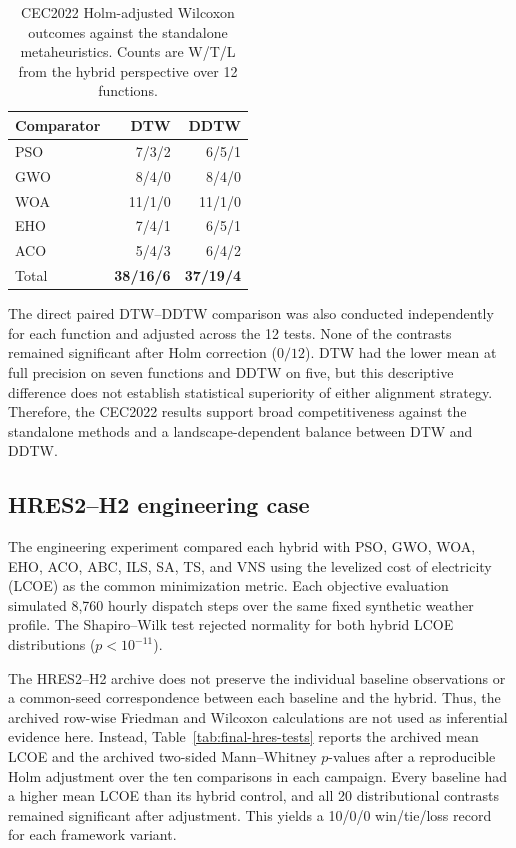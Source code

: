 \begin{table}[htbp]
\centering
\caption{CEC2022 Holm-adjusted Wilcoxon outcomes against the standalone
metaheuristics. Counts are W/T/L from the hybrid perspective over 12
functions.}
\label{tab:final-cec-wtl}
\begin{tabular}{lrr}
\toprule
Comparator & DTW & DDTW \\
\midrule
PSO & 7/3/2  & 6/5/1 \\
GWO & 8/4/0  & 8/4/0 \\
WOA & 11/1/0 & 11/1/0 \\
EHO & 7/4/1  & 6/5/1 \\
ACO & 5/4/3  & 6/4/2 \\
\midrule
Total & \textbf{38/16/6} & \textbf{37/19/4} \\
\bottomrule
\end{tabular}
\end{table}

The direct paired DTW--DDTW comparison was also conducted independently for
each function and adjusted across the 12 tests. None of the contrasts remained
significant after Holm correction ($0/12$). DTW had the lower mean at full
precision on seven functions and DDTW on five, but this descriptive difference
does not establish statistical superiority of either alignment strategy.
Therefore, the CEC2022 results support broad competitiveness against the
standalone methods and a landscape-dependent balance between DTW and DDTW.

\subsection{HRES2--H2 engineering case}
\label{sec:final-stat-hres2}

The engineering experiment compared each hybrid with PSO, GWO, WOA, EHO,
ACO, ABC, ILS, SA, TS, and VNS using the levelized cost of electricity (LCOE)
as the common minimization metric. Each objective evaluation simulated 8,760
hourly dispatch steps over the same fixed synthetic weather profile. The
Shapiro--Wilk test rejected normality for both hybrid LCOE distributions
($p<10^{-11}$).

The HRES2--H2 archive does not preserve the individual baseline observations
or a common-seed correspondence between each baseline and the hybrid. Thus,
the archived row-wise Friedman and Wilcoxon calculations are not used as
inferential evidence here. Instead, Table~\ref{tab:final-hres-tests} reports
the archived mean LCOE and the archived two-sided Mann--Whitney $p$-values
after a reproducible Holm adjustment over the ten comparisons in each
campaign. Every baseline had a higher mean LCOE than its hybrid control, and
all 20 distributional contrasts remained significant after adjustment. This
yields a 10/0/0 win/tie/loss record for each framework variant.

